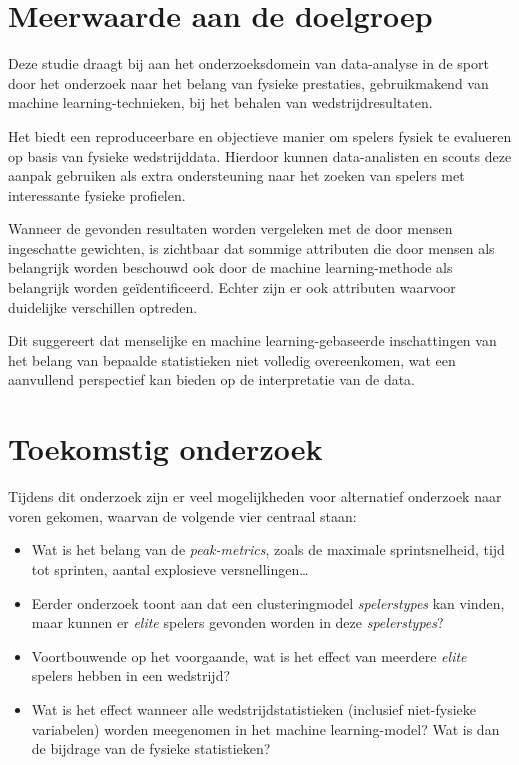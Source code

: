 \section{Meerwaarde aan de doelgroep}

Deze studie draagt bij aan het onderzoeksdomein van data-analyse in de sport door het onderzoek naar het belang van fysieke prestaties, gebruikmakend van machine learning-technieken, bij het behalen van wedstrijdresultaten.

Het biedt een reproduceerbare en objectieve manier om spelers fysiek te evalueren op basis van fysieke wedstrijddata. Hierdoor kunnen data-analisten en scouts deze aanpak gebruiken als extra ondersteuning naar het zoeken van spelers met interessante fysieke profielen.

Wanneer de gevonden resultaten worden vergeleken met de door mensen ingeschatte gewichten, is zichtbaar dat sommige attributen die door mensen als belangrijk worden beschouwd ook door de machine learning-methode als belangrijk worden geïdentificeerd. Echter zijn er ook attributen waarvoor duidelijke verschillen optreden. 

Dit suggereert dat menselijke en machine learning-gebaseerde inschattingen van het belang van bepaalde statistieken niet volledig overeenkomen, wat een aanvullend perspectief kan bieden op de interpretatie van de data.

\section{Toekomstig onderzoek}

Tijdens dit onderzoek zijn er veel mogelijkheden voor alternatief onderzoek naar voren gekomen, waarvan de volgende vier centraal staan:
\begin{itemize}
    \item Wat is het belang van de \emph{peak-metrics}, zoals de maximale sprintsnelheid, tijd tot sprinten, aantal explosieve versnellingen\dots
    \item Eerder onderzoek toont aan dat een clusteringmodel \emph{spelerstypes} kan vinden, maar kunnen er \emph{elite} spelers gevonden worden in deze \emph{spelerstypes}?
    \item Voortbouwende op het voorgaande, wat is het effect van meerdere \emph{elite} spelers hebben in een wedstrijd?
    \item Wat is het effect wanneer alle wedstrijdstatistieken (inclusief niet-fysieke variabelen) worden meegenomen in het machine learning-model? Wat is dan de bijdrage van de fysieke statistieken?
\end{itemize}

